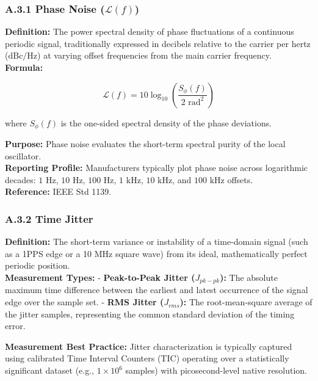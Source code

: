 \subsubsection{\texorpdfstring{A.3.1 Phase Noise
(\(\mathcal{L}(f)\))}{A.3.1 Phase Noise (\textbackslash mathcal\{L\}(f))}}\label{a.3.1-phase-noise-mathcallf}

\textbf{Definition:} The power spectral density of phase fluctuations of
a continuous periodic signal, traditionally expressed in decibels
relative to the carrier per hertz (\(\text{dBc/Hz}\)) at varying offset
frequencies from the main carrier frequency.\\
\textbf{Formula:}

\[ \mathcal{L}(f) = 10 \log_{10}\left( \frac{S_\phi(f)}{2\text{ rad}^2} \right) \]

where \(S_\phi(f)\) is the one-sided spectral density of the phase
deviations.

\textbf{Purpose:} Phase noise evaluates the short-term spectral purity
of the local oscillator.\\
\textbf{Reporting Profile:} Manufacturers typically plot phase noise
across logarithmic decades: \(1\text{ Hz}\), \(10\text{ Hz}\),
\(100\text{ Hz}\), \(1\text{ kHz}\), \(10\text{ kHz}\), and
\(100\text{ kHz}\) offsets.\\
\textbf{Reference:} IEEE Std 1139.

\subsubsection{A.3.2 Time Jitter}\label{a.3.2-time-jitter}

\textbf{Definition:} The short-term variance or instability of a
time-domain signal (such as a 1PPS edge or a 10 MHz square wave) from
its ideal, mathematically perfect periodic position.\\
\textbf{Measurement Types:} - \textbf{Peak-to-Peak Jitter
(\(J_{pk-pk}\)):} The absolute maximum time difference between the
earliest and latest occurrence of the signal edge over the sample set. -
\textbf{RMS Jitter (\(J_{rms}\)):} The root-mean-square average of the
jitter samples, representing the common standard deviation of the timing
error.

\textbf{Measurement Best Practice:} Jitter characterization is typically
captured using calibrated Time Interval Counters (TIC) operating over a
statistically significant dataset (e.g., \(1 \times 10^6\) samples) with
picosecond-level native resolution.


